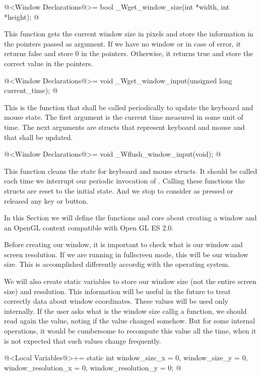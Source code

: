 \iniciocodigo
@<Window Declarations@>=
bool _Wget_window_size(int *width, int *height);
@
\fimcodigo

This function gets the current window size in pixels and store the
information in the pointers passed as argument. If we have no window
or in case of error, it returns false and store 0 in the
pointers. Otherwise, it returns true and store the correct value in
the pointers.

\iniciocodigo
@<Window Declarations@>=
void _Wget_window_input(unsigned long current_time);
@
\fimcodigo

This is the function that shall be called periodically to update the
keyboard and mouse state. The first argument is the current time
measured in some unit of time. The next arguments are structs that
represent keyboard and mouse and that shall be updated.

\iniciocodigo
@<Window Declarations@>=
void _Wflush_window_input(void);
@
\fimcodigo

This function cleans the state for keyboard and mouse structs. It
should be called each time we interrupt our periodic invocation
of . Calling these functions the
structs are reset to the initial state. And we stop to consider as
pressed or released any key or button.


In this Section we will define the functions and core about creating a
window and an OpenGL context compatible with Open GL ES 2.0.


Before creating our window, it is important to check what is our
window and screen resolution. If we are running in fullscreen mode,
this will be our window size. This is accomplished differently
accordig with the operating system.

We will also create static variables to store our window size (not the
entire screen size) and resolution. This information will be useful in
the future to treat correctly data about window coordinates. These
values will be used only internally. If the user asks what is the
window size callig a function, we should read again the value, noting
if the value changed somehow. But for some internal operations, it
would be cumbersome to recompute this value all the time, when it is
not expected that such values change frequently.

\iniciocodigo
@<Local Variables@>+=
static int window_size_x = 0, window_size_y = 0, window_resolution_x = 0,
           window_resolution_y = 0;
@
\fimcodigo

